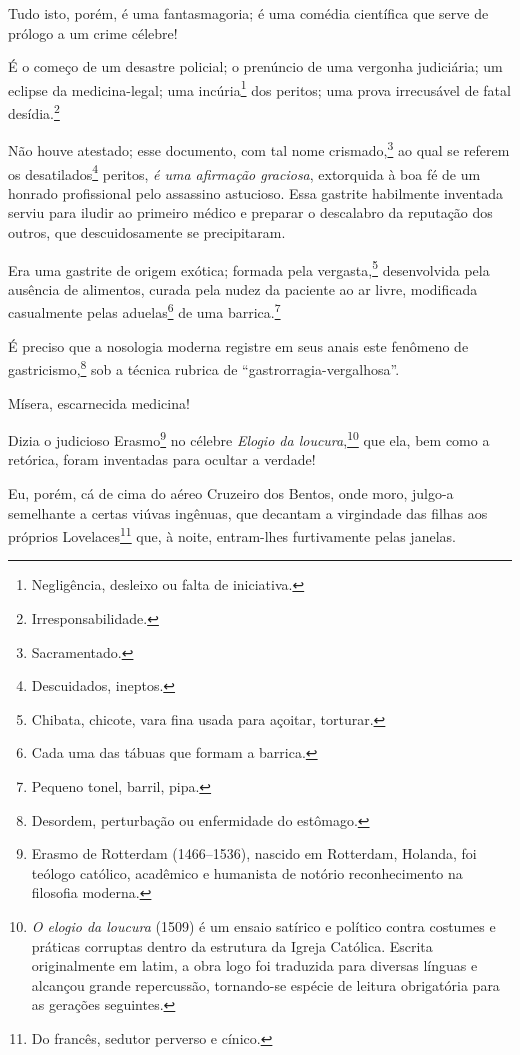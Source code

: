 Tudo isto, porém, é uma fantasmagoria; é uma comédia científica que
serve de prólogo a um crime célebre!

É o começo de um desastre policial; o prenúncio de uma vergonha
judiciária; um eclipse da medicina-legal; uma incúria\footnote{
  Negligência, desleixo ou falta de iniciativa.} dos peritos; uma prova
irrecusável de fatal desídia.\footnote{Irresponsabilidade.}

Não houve atestado; esse documento, com tal nome crismado,\footnote{
  Sacramentado.} ao qual se referem os desatilados\footnote{
  Descuidados, ineptos.} peritos, \emph{é uma afirmação graciosa},
extorquida à boa fé de um honrado profissional pelo assassino astucioso.
Essa gastrite habilmente inventada serviu para iludir ao primeiro médico
e preparar o descalabro da reputação dos outros, que descuidosamente se
precipitaram.

Era uma gastrite de origem exótica; formada pela vergasta,\footnote{
  Chibata, chicote, vara fina usada para açoitar, torturar.}
desenvolvida pela ausência de alimentos, curada pela nudez da paciente
ao ar livre, modificada casualmente pelas aduelas\footnote{Cada uma
  das tábuas que formam a barrica.} de uma barrica.\footnote{Pequeno
  tonel, barril, pipa.}

É preciso que a nosologia moderna registre em seus anais este fenômeno
de gastricismo,\footnote{Desordem, perturbação ou enfermidade do
  estômago.} sob a técnica rubrica de ``gastrorragia-vergalhosa''.

Mísera, escarnecida medicina!

Dizia o judicioso Erasmo\footnote{Erasmo de Rotterdam (1466--1536), 
  nascido em Rotterdam, Holanda, foi teólogo católico, acadêmico e
  humanista de notório reconhecimento na filosofia moderna.} no célebre
\emph{Elogio da loucura},\footnote{\emph{O elogio da loucura} (1509) é
  um ensaio satírico e político contra costumes e práticas corruptas
  dentro da estrutura da Igreja Católica. Escrita originalmente em
  latim, a obra logo foi traduzida para diversas línguas e alcançou
  grande repercussão, tornando-se espécie de leitura obrigatória para as
  gerações seguintes.} que ela, bem como a retórica, foram inventadas
para ocultar a verdade!

Eu, porém, cá de cima do aéreo Cruzeiro dos Bentos, onde moro, julgo-a
semelhante a certas viúvas ingênuas, que decantam a virgindade das
filhas aos próprios Lovelaces\footnote{Do francês, sedutor perverso e
  cínico.} que, à noite, entram-lhes furtivamente pelas janelas.


